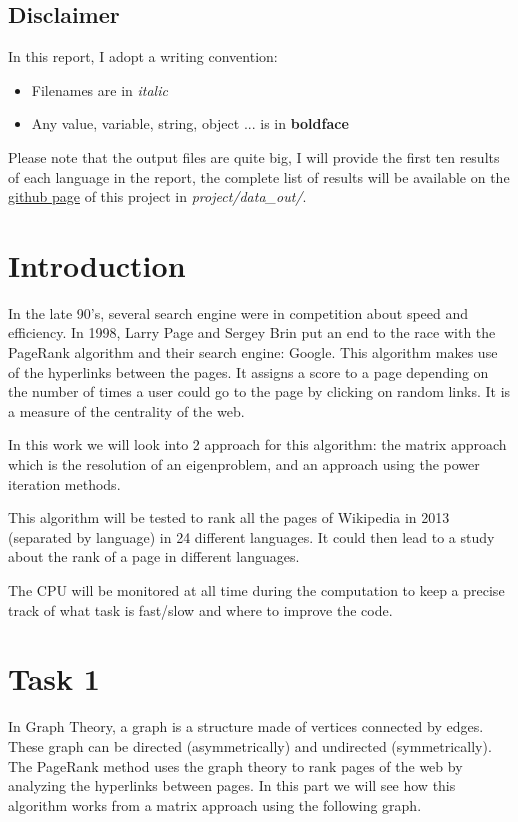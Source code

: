 \subsection*{Disclaimer}
In this report, I adopt a writing convention:
\begin{itemize}
    \item Filenames are in \textit{italic}
    \item Any value, variable, string, object ... is in \textbf{boldface} 
\end{itemize}
Please note that the output files are quite big, I will provide the first ten results of each language in the report, the complete list of results will be available on the \href{https://github.com/PaxOwl/big-data-project}{github page} of this project in \textit{project/data\_out/}.
\section{Introduction}
In the late 90's, several search engine were in competition about speed and efficiency. In 1998, Larry Page and Sergey Brin put an end to the race with the PageRank algorithm and their search engine: Google. This algorithm makes use of the hyperlinks between the pages. It assigns a score to a page depending on the number of times a user could go to the page by clicking on random links. It is a measure of the centrality of the web.

In this work we will look into 2 approach for this algorithm: the matrix approach which is the resolution of an eigenproblem, and an approach using the power iteration methods.

This algorithm will be tested to rank all the pages of Wikipedia in 2013 (separated by language) in 24 different languages. It could then lead to a study about the rank of a page in different languages.

The CPU will be monitored at all time during the computation to keep a precise track of what task is fast/slow and where to improve the code.
\newpage
\section{Task 1}
\label{sec:task1}
In Graph Theory, a graph is a structure made of vertices connected by edges. These graph can be directed (asymmetrically) and undirected (symmetrically). The PageRank method uses the graph theory to rank pages of the web by analyzing the hyperlinks between pages. In this part we will see how this algorithm works from a matrix approach using the following graph.

